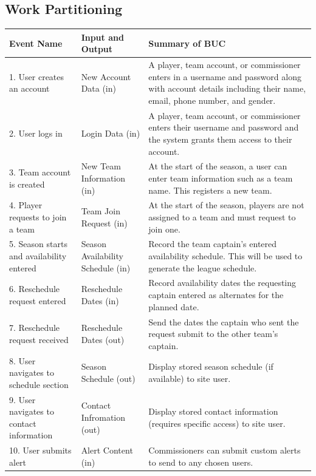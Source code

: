 \documentclass[12pt]{article}
\begin{document}
\subsection{Work Partitioning}
  \begin{center}
    \begin{tabular}{|m{4cm}|m{4cm}|m{6cm}|}
      \hline
      Event Name & Input and Output & Summary of BUC\\
      \hline
      1. User creates an account & New Account Data (in) & A player, team account, or
      commissioner enters in a username and password along with account details
      including their name, email, phone number, and gender.\\
      2. User logs in & Login Data (in) & A player, team account, or commissioner
      enters their username and password and the system grants them access to
      their account.\\
      3. Team account is created & New Team Information (in) & At the
      start of the season, a user can enter team information such as a team
      name. This registers a new team.\\
      4. Player requests to join a team & Team Join Request (in) & At the
      start of the season, players are not assigned to a team and must request
      to join one.\\
      5. Season starts and availability entered & Season Availability Schedule
      (in) & Record the team captain's entered availability schedule. This
      will be used to generate the league schedule.\\
      6. Reschedule request entered & Reschedule Dates (in) & Record
      availability dates the requesting captain entered as alternates for the
      planned date.\\
      7. Reschedule request received & Reschedule Dates (out) & Send the dates
      the captain who sent the request submit to the other team's captain.\\
      8. User navigates to schedule section & Season Schedule (out) & Display
      stored season schedule (if available) to site user.\\
      9. User navigates to contact information & Contact Infromation (out) & Display
      stored contact information (requires specific access) to site user.\\
      10. User submits alert & Alert Content (in) & Commissioners can submit custom
      alerts to send to any chosen users.\\
      \hline
    \end{tabular}
  \end{center}
\end{document}
